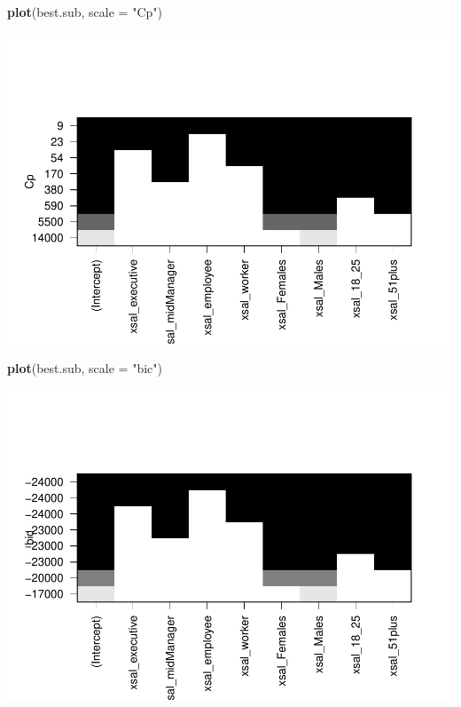\documentclass[]{article}
\newenvironment{Shaded}{\begin{snugshade}}{\end{snugshade}}
\newcommand{\KeywordTok}[1]{\textcolor[rgb]{0.13,0.29,0.53}{\textbf{#1}}}
\newcommand{\DataTypeTok}[1]{\textcolor[rgb]{0.13,0.29,0.53}{#1}}
\newcommand{\StringTok}[1]{\textcolor[rgb]{0.31,0.60,0.02}{#1}}
\newcommand{\NormalTok}[1]{#1}
\begin{document}
\begin{Shaded}
\begin{Highlighting}[]
\KeywordTok{plot}\NormalTok{(best.sub, }\DataTypeTok{scale =} \StringTok{"Cp"}\NormalTok{)}
\end{Highlighting}
\end{Shaded}

\includegraphics{TSLproject_files/figure-latex/unnamed-chunk-17-8.pdf}

\begin{Shaded}
\begin{Highlighting}[]
\KeywordTok{plot}\NormalTok{(best.sub, }\DataTypeTok{scale =} \StringTok{"bic"}\NormalTok{)}
\end{Highlighting}
\end{Shaded}

\includegraphics{TSLproject_files/figure-latex/unnamed-chunk-17-9.pdf}
\end{document}

